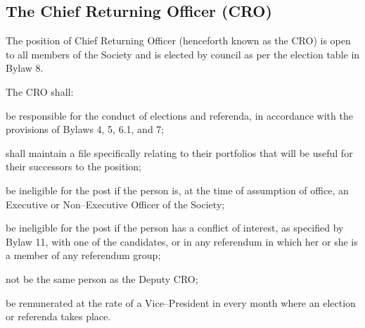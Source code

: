 \subsection {The Chief Returning Officer (CRO)}
\begin{longenum}[ label*=\thesubsection.\arabic*., align=left]
	\item The position of Chief Returning Officer (henceforth known as the CRO) is open to all members of the Society and is elected by council as per the election table in Bylaw 8.
    \item The CRO shall: 
    \begin{longenum}[ label*=\arabic*., align=left]
		\item  be responsible for the conduct of elections and referenda, in accordance with the provisions of Bylaws 4, 5, 6.1, and 7; 
		\item shall maintain a file specifically relating to their portfolios that will be useful for their successors to the position; 
        \item be ineligible for the post if the person is, at the time of assumption of office, an Executive or Non--Executive Officer of the Society; 
        \item be ineligible for the post if the person has a conflict of interest, as specified by Bylaw 11, with one of the candidates, or in any referendum in which her or she is a member of any referendum group;
        \item not be the same person as the Deputy CRO;
        \item be remunerated at the rate of a Vice--President in every month where an election or referenda takes place. 
        \end{longenum}
\end{longenum}

